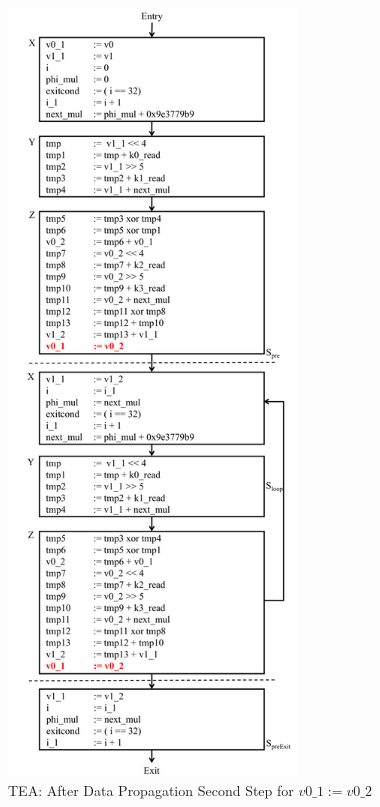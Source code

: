 \begin{figure}[H]
\begin{center}
\includegraphics[height=8in]{fig-proposal/tea-after-data-propagation2}
\caption{TEA: After Data Propagation Second Step for $v0\_1 := v0\_2$}
\label{fig:tea-after-data-propagation2}
\end{center}
\end{figure}

